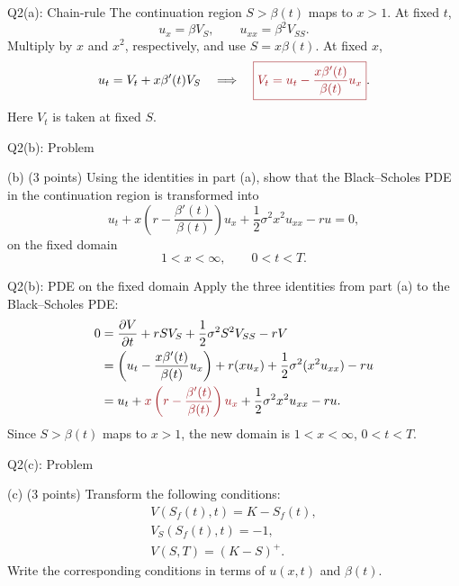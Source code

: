 \documentclass{beamer}
\newcommand{\keymath}[1]{\textcolor{lecturekey}{#1}}
\newcommand{\keybox}[1]{\keymath{\boxed{#1}}}
\begin{document}
\begin{frame}{Q2(a): Chain-rule}
\small
The continuation region $S>\beta(t)$ maps to $x>1$.
At fixed $t$,
\[
u_x=\beta V_S,\qquad u_{xx}=\beta^2V_{SS}.
\]
Multiply by $x$ and $x^2$, respectively, and use $S=x\beta(t)$.
At fixed $x$,
\[
u_t=V_t+x\beta'(t)V_S
\quad\Longrightarrow\quad
\keybox{V_t=u_t-\frac{x\beta'(t)}{\beta(t)}u_x}.
\]
Here $V_t$ is taken at fixed $S$.
\end{frame}

\begin{frame}{Q2(b): Problem}
\footnotesize
\setlength{\abovedisplayskip}{5pt}
\setlength{\belowdisplayskip}{5pt}
\begin{block}{(b) \hfill (3 points)}
Using the identities in part (a), show that the Black--Scholes PDE in the
continuation region is transformed into
\[
u_t+x\left(r-\frac{\beta'(t)}{\beta(t)}\right)u_x
+\frac12\sigma^2x^2u_{xx}-ru=0,
\]
on the fixed domain
\[
1<x<\infty,\qquad 0<t<T.
\]
\end{block}
\end{frame}

\begin{frame}{Q2(b): PDE on the fixed domain}
\small
Apply the three identities from part (a) to the Black--Scholes PDE:
\begin{align*}
0
&= \frac{\partial V}{\partial t}+rSV_S
   +\frac12\sigma^2S^2V_{SS}-rV\\
&= \left(u_t-\frac{x\beta'(t)}{\beta(t)}u_x\right)
   +r(xu_x)+\frac12\sigma^2(x^2u_{xx})-ru\\
&= u_t+\keymath{x\left(r-\frac{\beta'(t)}{\beta(t)}\right)u_x}
   +\frac12\sigma^2x^2u_{xx}-ru.
\end{align*}
Since $S>\beta(t)$ maps to $x>1$, the new domain is
$1<x<\infty$, $0<t<T$.
\end{frame}

\begin{frame}{Q2(c): Problem}
\footnotesize
\setlength{\abovedisplayskip}{5pt}
\setlength{\belowdisplayskip}{5pt}
\begin{block}{(c) \hfill (3 points)}
Transform the following conditions:
\begin{gather*}
V(S_f(t),t)=K-S_f(t),\\
V_S(S_f(t),t)=-1,\\
V(S,T)=(K-S)^+.
\end{gather*}
Write the corresponding conditions in terms of $u(x,t)$ and $\beta(t)$.
\end{block}
\end{frame}
\end{document}
